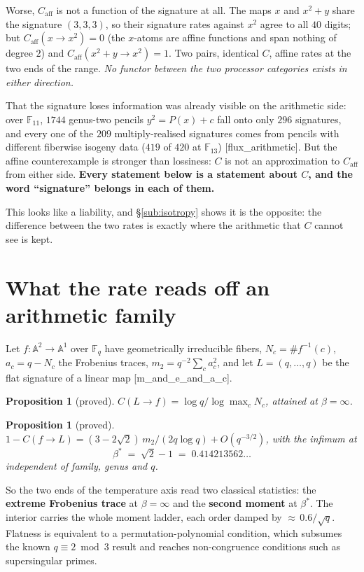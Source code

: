 \documentclass[11pt]{article}
\theoremstyle{plain}
\newtheorem{proposition}[theorem]{Proposition}
\theoremstyle{remark}
\newcommand{\F}{\mathbb F}
\newcommand{\A}{\mathbb A}
\newcommand{\caff}{C_{\mathrm{aff}}}
\newcommand{\ra}{\rightarrow}
\newcommand{\source}[1]{{\normalfont\small\textsf{[#1]}}}
\begin{document}
Worse, $\caff$ is not a function of the signature at all.  The maps $x$ and
$x^2+y$ share the signature $(3,3,3)$, so their signature rates against $x^2$
agree to all $40$ digits; but $\caff(x \ra x^2) = 0$ (the $x$-atoms are affine
functions and span nothing of degree $2$) and $\caff(x^2+y \ra x^2) = 1$.  Two
pairs, identical $C$, affine rates at the two ends of the range.  \emph{No
functor between the two processor categories exists in either direction.}

That the signature loses information was already visible on the arithmetic side:
over $\F_{11}$, $1744$ genus-two pencils $y^2 = P(x)+c$ fall onto only $296$
signatures, and every one of the $209$ multiply-realised signatures comes from
pencils with different fiberwise isogeny data ($419$ of $420$ at $\F_{13}$)
\source{flux\_arithmetic}.  But the affine counterexample is stronger than
lossiness: $C$ is not an approximation to $\caff$ from either side.
\textbf{Every statement below is a statement about $C$, and the word
``signature'' belongs in each of them.}

This looks like a liability, and \S\ref{sub:isotropy} shows it is the
opposite: the difference between the two rates is exactly where the arithmetic
that $C$ cannot see is kept.

\section{What the rate reads off an arithmetic family}

Let $f : \A^2 \ra \A^1$ over $\F_q$ have geometrically irreducible fibers,
$N_c = \#f^{-1}(c)$, $a_c = q - N_c$ the Frobenius traces,
$m_2 = q^{-2}\sum_c a_c^2$, and let $L = (q,\dots,q)$ be the flat signature of a
linear map \source{m\_and\_e\_and\_a\_c}.

\begin{proposition}[proved]\label{prop:endpoint}
$C(L\ra f) = \log q / \log \max_c N_c$, attained at $\beta = \infty$.
\end{proposition}

\begin{proposition}[proved]\label{prop:bottleneck}
$1 - C(f\ra L) = (3-2\sqrt2)\,m_2/(2q\log q) + O(q^{-3/2})$, with the infimum at
\[
  \beta^{*} \;=\; \sqrt2 - 1 \;=\; 0.414213562\ldots
\]
independent of family, genus and $q$.
\end{proposition}

So the two ends of the temperature axis read two classical statistics: the
\textbf{extreme Frobenius trace} at $\beta = \infty$ and the \textbf{second
moment} at $\beta^{*}$.  The interior carries the whole moment ladder, each
order damped by ${\approx}\,0.6/\sqrt q$.  Flatness is equivalent to a
permutation-polynomial condition, which subsumes the known $q \equiv 2 \bmod 3$
result and reaches non-congruence conditions such as supersingular primes.
\end{document}

